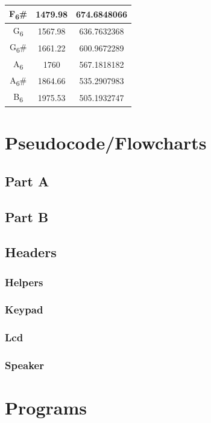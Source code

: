 \documentclass[letterpaper, 12pt]{article}
\begin{document}
\begin{itemize}
\begin{center}
\begin{tabular}{| c | c | c |}
				\hline
				F\textsubscript{6}\# & 1479.98 & 674.6848066 \\
				\hline
				G\textsubscript{6} & 1567.98 & 636.7632368 \\
				\hline
				G\textsubscript{6}\# & 1661.22 & 600.9672289 \\
				\hline
				A\textsubscript{6} & 1760 & 567.1818182 \\
				\hline
				A\textsubscript{6}\# & 1864.66 & 535.2907983 \\
				\hline
				B\textsubscript{6} & 1975.53 & 505.1932747 \\
				\hline
      \end{tabular}
    \end{center}
\end{itemize}
\section*{Pseudocode/Flowcharts}
\subsection*{Part A}

\subsection*{Part B}

\subsection*{Headers}
\subsubsection*{Helpers}

\subsubsection*{Keypad}

\subsubsection*{Lcd}

\subsubsection*{Speaker}

\section*{Programs}
\end{document}
